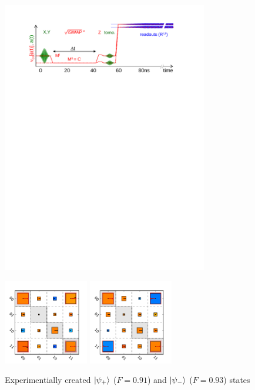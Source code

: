 \begin{figure}
	\centering
		\includegraphics[width=0.8\textwidth]{./material/papers/iswap/figures/iswap_gate_pulse_sequence}
	\label{fig:ISwapPulseSequence}
	\caption{}
\end{figure}

\begin{figure}
  \flushright
	\includegraphics[width=0.33\textwidth]{./data/ct5/psi_plus}
	\includegraphics[width=0.33\textwidth]{./data/ct5/psi_minus}
	\caption{Experimentially created $\left| \psi_+ \right>$ ($F = 0.91$) and $\left| \psi_- \right>$ ($F=0.93$) states}
	\label{fig:BellStates}
\end{figure}


